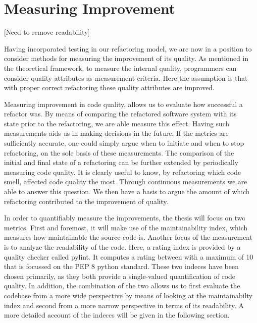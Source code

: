 \section{Measuring Improvement}
[Need to remove readability]

Having incorporated testing in our refactoring model, we are now in a position to consider methods for measuring the improvement of its quality. As mentioned in the theoretical framework, to measure the internal quality, programmers can consider quality attributes as measurement criteria. Here the assumption is that with proper correct refactoring these quality attributes are improved.


Measuring improvement in code quality, allows us to evaluate how successful a refactor was. By means of comparing the refactored software system with its state prior to the refactoring, we are able measure this effect. Having such measurements aids us in making decisions in the future. If the metrics are sufficiently accurate, one could simply argue when to initiate and when to stop refactoring, on the sole basis of these measurements. The comparison of the initial and final state of a refactoring can be further extended by periodically measuring code quality. It is clearly useful to know, by refactoring which code smell, affected code quality the most. Through continuous measurements we are able to answer this question. We then have a basis to argue the amount of which refactoring contributed to the improvement of quality. 

In order to quantifiably measure the improvements, the thesis will focus on two metrics. First and foremost, it will make use of the maintainability index, which measures how maintainable the source code is. Another focus of the measurement is to analyze the readability of the code. Here, a rating index is provided by a quality checker called pylint. It computes a rating between with a maximum of 10 that is focussed on the PEP 8 python standard. These two indeces have been chosen primarily, as they both provide a single-valued quantification of code quality. In addition, the combination of the two allows us to first evaluate the codebase from a more wide perspective by means of looking at the maintainabilty index and second from a more narrow perspective in terms of its readability. A more detailed account of the indeces will be given in the following section.

